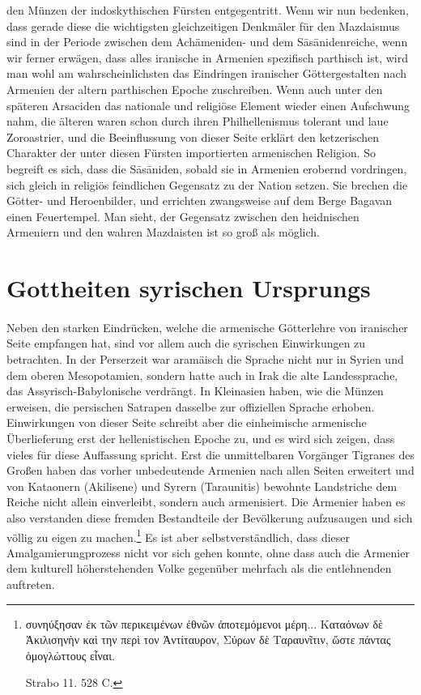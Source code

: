 \documentclass{article}
\begin{document}
den Münzen der indoskythischen Fürsten entgegentritt. Wenn wir nun bedenken, dass gerade diese die wichtigsten gleichzeitigen Denkmäler für den Mazdaismus sind in der Periode zwischen dem Achämeniden- und dem Sāsānidenreiche, wenn wir ferner erwägen, dass alles iranische in Armenien spezifisch parthisch ist, wird man wohl am wahrscheinlichsten das Eindringen iranischer Göttergestalten nach Armenien der altern parthischen Epoche zuschreiben. Wenn auch unter den späteren Arsaciden das nationale und religiöse Element wieder einen Aufschwung nahm, die älteren waren schon durch ihren Philhellenismus tolerant und laue Zoroastrier, und die Beeinflussung von dieser Seite erklärt den ketzerischen Charakter der unter diesen Fürsten importierten armenischen Religion. So begreift es sich, dass die Sāsāniden, sobald sie in Armenien erobernd vordringen, sich gleich in religiös feindlichen Gegensatz zu der Nation setzen. Sie brechen die Götter- und Heroenbilder, und errichten zwangsweise auf dem Berge Bagavan einen Feuertempel. Man sieht, der Gegensatz zwischen den heidnischen Armeniern und den wahren Mazdaisten ist so groß als möglich.
\clearpage
\section{Gottheiten syrischen Ursprungs}
\paragraph{}
Neben den starken Eindrücken, welche die armenische Götterlehre von iranischer Seite empfangen hat, sind vor allem auch die syrischen Einwirkungen zu betrachten. In der Perserzeit war aramäisch die Sprache nicht nur in Syrien und dem oberen Mesopotamien, sondern hatte auch in Irak die alte Landessprache, das Assyrisch-Babylonische verdrängt. In Kleinasien haben, wie die Münzen erweisen, die persischen Satrapen dasselbe zur offiziellen Sprache erhoben. Einwirkungen von dieser Seite schreibt aber die einheimische armenische Überlieferung erst der hellenistischen Epoche zu, und es wird sich zeigen, dass vieles für diese Auffassung spricht. Erst die unmittelbaren Vorgänger Tigranes des Großen haben das vorher unbedeutende Armenien nach allen Seiten erweitert und von Kataonern (Akilisene) und Syrern (Taraunitis) bewohnte Landstriche dem Reiche nicht allein einverleibt, sondern auch armenisiert. Die Armenier haben es also verstanden diese fremden Bestandteile der Bevölkerung aufzusaugen und sich völlig zu eigen zu machen.\footnote{\begin{greek}συνηύξησαν ἐκ τῶν περικειμένων ἐθνῶν ἀποτεμόμενοι μέρη... Καταόνων δὲ Ἀκιλισηνὴν καὶ την περὶ τον Ἀντίταυρον, Σύρων δὲ Ταραυνῖτιν, ὥστε πάντας ὁμογλώττους εἶναι.\end{greek} Strabo 11. 528 C.} Es ist aber selbstverständlich, dass dieser Amalgamierungprozess nicht vor sich gehen konnte, ohne dass auch die Armenier dem kulturell höherstehenden Volke gegenüber mehrfach als die entlehnenden auftreten.
\end{document}
